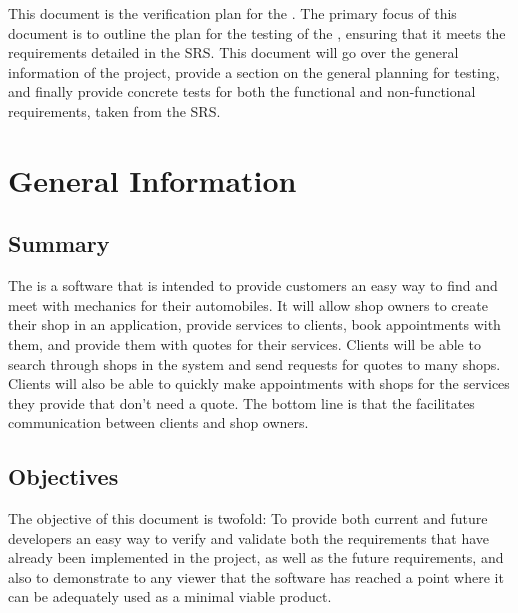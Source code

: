 \documentclass[12pt, titlepage]{article}
\begin{document}
This document is the verification plan for the \progname{}. The primary focus of this document is to outline the plan for the testing of the \progname{}, ensuring that it meets the requirements detailed in the SRS. This document will go over the general information of the project, provide a section on the general planning for testing, and finally provide concrete tests for both the functional and non-functional requirements, taken from the SRS. 

\section{General Information}

\subsection{Summary}

The \progname{} is a software that is intended to provide customers an easy way to find and meet with mechanics for their automobiles. It will allow shop owners to create their shop in an application, provide services to clients, book appointments with them, and provide them with quotes for their services. Clients will be able to search through shops in the system and send requests for quotes to many shops. Clients will also be able to quickly make appointments with shops for the services they provide that don't need a quote. The bottom line is that the \progname{} facilitates communication between clients and shop owners.

\subsection{Objectives}

The objective of this document is twofold: To provide both current and future developers an easy way to verify and validate both the requirements that have already been implemented in the project, as well as the future requirements, and also to demonstrate to any viewer that the software has reached a point where it can be adequately used as a minimal viable product.
\end{document}
